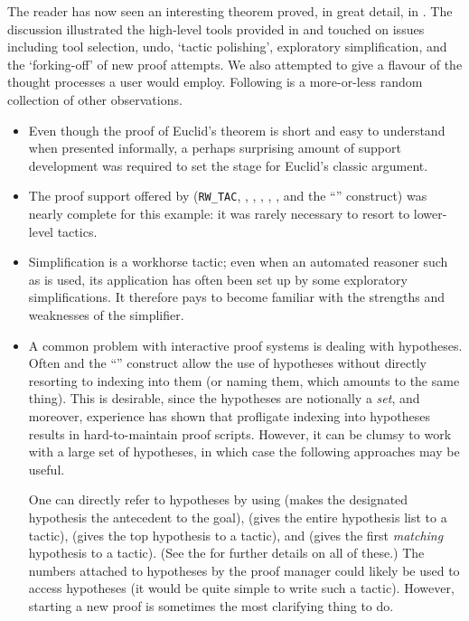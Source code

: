 The reader has now seen an interesting theorem proved, in great detail,
in \holn{}. The discussion illustrated the high-level tools provided in
 and touched on issues including tool selection, undo,
`tactic polishing', exploratory simplification, and the `forking-off' of
new proof attempts. We also attempted to give a flavour of the thought
processes a user would employ. Following is a more-or-less random
collection of other observations.
\begin{itemize}

\item Even though the proof of Euclid's theorem is short and easy to
understand when presented informally, a perhaps surprising amount of
support development was required to set the stage for Euclid's classic
argument.

\item The proof support offered by 
(\verb+RW_TAC+, , , ,
, , and the ``'' construct) was
nearly complete for this example: it was rarely necessary to resort to
lower-level tactics.

\item Simplification is a workhorse tactic; even when an automated
reasoner such as  is used, its application has often been
set up by some exploratory simplifications. It therefore pays to become
familiar with the strengths and weaknesses of the simplifier.

\item A common problem with interactive proof systems is dealing with
hypotheses. Often  and the ``'' construct allow
the use of hypotheses without directly resorting to indexing into them
(or naming them, which amounts to the same thing). This is desirable,
since the hypotheses are notionally a {\it set}, and moreover,
experience has shown that profligate indexing into hypotheses results in
hard-to-maintain proof scripts. However, it can be clumsy to work with a
large set of hypotheses, in which case the following approaches may be
useful.

One can directly refer to hypotheses by using  (makes
the designated hypothesis the antecedent to the goal),
 (gives the entire hypothesis list to a tactic),
 (gives the top hypothesis to a tactic), and
 (gives the first {\it matching\/} hypothesis to a
tactic). (See the \REFERENCE{} for further details on all of these.)
The numbers attached to hypotheses by the proof manager could likely
be used to access hypotheses (it would be quite simple to write such a
tactic). However, starting a new proof is sometimes the most
clarifying thing to do.


\end{itemize}

